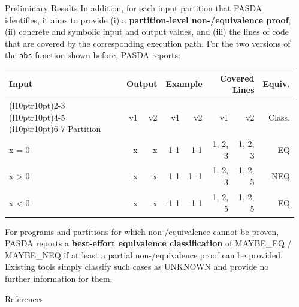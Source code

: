 \documentclass[final,hyperref={pdfpagelabels=false}]{beamer}
\begin{document}
\begin{frame}[t]
\begin{columns}[t]
\begin{column}{.47\textwidth}
\begin{block}{Preliminary Results}
      In addition, for each input partition that PASDA identifies, it aims to provide (i) a \textbf{partition-level non-/equivalence proof}, (ii) concrete and symbolic input and output values, and (iii) the lines of code that are covered by the corresponding execution path. For the two versions of the \texttt{abs} function shown before, PASDA reports:

      \vspace{20pt}
      \begin{table}[]
        \setlength{\tabcolsep}{1ex}
        \begin{tabular}{lrrrrrrr} \toprule
          Input           & \multicolumn{2}{r}{Output} & \multicolumn{2}{r}{Example}                      & \multicolumn{2}{r}{Covered Lines} & Equiv. \\ \cmidrule(l{10pt}r{10pt}){2-3} \cmidrule(l{10pt}r{10pt}){4-5} \cmidrule(l{10pt}r{10pt}){6-7}
          Partition                  & v1     & v2                & v1                     & v2                      & v1            & v2      & Class.               \\ \midrule
          x = 0               &  x     &  x                &  1 \textrightarrow{} 1 &  1 \textrightarrow{}  1 & 1, 2, 3       & 1, 2, 3 & EQ             \\
          x \textgreater{} 0  &  x     & -x                &  1 \textrightarrow{} 1 &  1 \textrightarrow{} -1 & 1, 2, 3       & 1, 2, 5 & NEQ            \\
          x \textless{} 0     & -x     & -x                & -1 \textrightarrow{} 1 & -1 \textrightarrow{}  1 & 1, 2, 5       & 1, 2, 5 & EQ            \\ \bottomrule
        \end{tabular}
      \end{table}
      \vspace{20pt}

      For programs and partitions for which non-/equivalence cannot be proven, PASDA reports a \textbf{best-effort equivalence classification} of MAYBE\_EQ / MAYBE\_NEQ if at least a partial non-/equivalence proof can be provided. Existing tools simply classify such cases as UNKNOWN and provide no further information for them.
    \end{block}

    \begin{block}{References}
      \nocite{*} %
      \linespread{0.928}\selectfont
      \footnotesize{
      }
    \end{block}
  \end{column} %

  \begin{column}{.02\textwidth}\end{column} %

\end{columns} %

\end{frame} %
\end{document}
